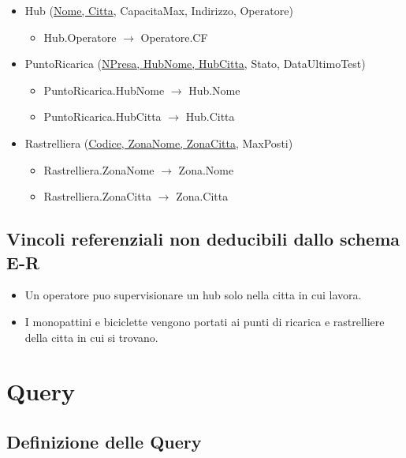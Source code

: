 \documentclass[11pt,a4paper]{article}
\begin{document}
\begin{itemize}
    \item Hub (\underline{Nome, Citta}, CapacitaMax, Indirizzo, Operatore)
          \begin{itemize}
              \item Hub.Operatore $\to$ Operatore.CF
          \end{itemize}

    \item PuntoRicarica (\underline{NPresa, HubNome, HubCitta}, Stato, DataUltimoTest)
          \begin{itemize}
              \item PuntoRicarica.HubNome $\to$ Hub.Nome
              \item PuntoRicarica.HubCitta $\to$ Hub.Citta
          \end{itemize}

    \item Rastrelliera (\underline{Codice, ZonaNome, ZonaCitta}, MaxPosti)
          \begin{itemize}
              \item Rastrelliera.ZonaNome $\to$ Zona.Nome
              \item Rastrelliera.ZonaCitta $\to$ Zona.Citta
          \end{itemize}
\end{itemize}

\subsection{Vincoli referenziali non deducibili dallo schema E-R}

\begin{itemize}
    \item Un operatore puo supervisionare un hub solo nella citta in cui lavora.
    \item I monopattini e biciclette vengono portati ai punti di ricarica e rastrelliere della citta in cui si trovano.
\end{itemize}

\section{Query}
\subsection{Definizione delle Query}

\end{document}
